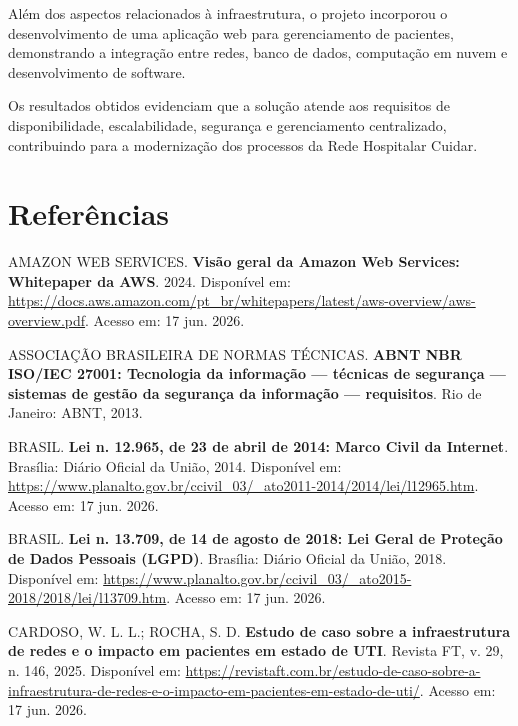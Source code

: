 \documentclass[12pt,a4paper,oneside]{report}
\begin{document}
Além dos aspectos relacionados à infraestrutura, o projeto incorporou o desenvolvimento de uma aplicação web para gerenciamento de pacientes, demonstrando a integração entre redes, banco de dados, computação em nuvem e desenvolvimento de software.

Os resultados obtidos evidenciam que a solução atende aos requisitos de disponibilidade, escalabilidade, segurança e gerenciamento centralizado, contribuindo para a modernização dos processos da Rede Hospitalar Cuidar.

\chapter*{Referências}



AMAZON WEB SERVICES. \textbf{Visão geral da Amazon Web Services: Whitepaper da AWS}. 2024. Disponível em: \url{https://docs.aws.amazon.com/pt_br/whitepapers/latest/aws-overview/aws-overview.pdf}. Acesso em: 17 jun. 2026.

\vspace{0.2cm}

ASSOCIAÇÃO BRASILEIRA DE NORMAS TÉCNICAS. \textbf{ABNT NBR ISO/IEC 27001: Tecnologia da informação --- técnicas de segurança --- sistemas de gestão da segurança da informação --- requisitos}. Rio de Janeiro: ABNT, 2013.

\vspace{0.2cm}

BRASIL. \textbf{Lei n. 12.965, de 23 de abril de 2014: Marco Civil da Internet}. Brasília: Diário Oficial da União, 2014. Disponível em: \url{https://www.planalto.gov.br/ccivil_03/_ato2011-2014/2014/lei/l12965.htm}. Acesso em: 17 jun. 2026.

\vspace{0.2cm}

BRASIL. \textbf{Lei n. 13.709, de 14 de agosto de 2018: Lei Geral de Proteção de Dados Pessoais (LGPD)}. Brasília: Diário Oficial da União, 2018. Disponível em: \url{https://www.planalto.gov.br/ccivil_03/_ato2015-2018/2018/lei/l13709.htm}. Acesso em: 17 jun. 2026.

\vspace{0.2cm}

CARDOSO, W. L. L.; ROCHA, S. D. \textbf{Estudo de caso sobre a infraestrutura de redes e o impacto em pacientes em estado de UTI}. Revista FT, v. 29, n. 146, 2025. Disponível em: \url{https://revistaft.com.br/estudo-de-caso-sobre-a-infraestrutura-de-redes-e-o-impacto-em-pacientes-em-estado-de-uti/}. Acesso em: 17 jun. 2026.
\end{document}
